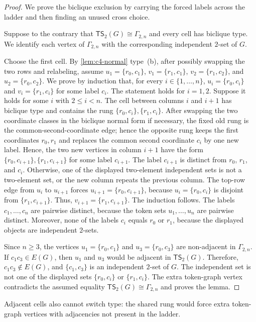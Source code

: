 \documentclass[a4paper]{article}
\theoremstyle{plain}
\theoremstyle{definition}
\newcommand{\TSsym}{\mathsf{TS}}
\numberwithin{equation}{section}
\begin{document}
\begin{proof}
We prove the biclique exclusion by carrying the forced labels across the ladder and then finding an unused cross choice.

Suppose to the contrary that $\TSsym_2(G)\cong \Gamma_{2,n}$ and every cell has biclique type.
We identify each vertex of $\Gamma_{2,n}$ with the corresponding independent $2$-set of $G$.

Choose the first cell.
By \cref{lem:c4-normal} type~\textup{(b)}, after possibly swapping the two rows and relabeling, assume $u_1=\{r_0,c_1\}$, $v_1=\{r_1,c_1\}$, $v_2=\{r_1,c_2\}$, and $u_2=\{r_0,c_2\}$.
We prove by induction that, for every $i\in\{1,\ldots,n\}$,
$u_i=\{r_0,c_i\}$ and $v_i=\{r_1,c_i\}$
for some label $c_i$.
The statement holds for $i=1,2$.
Suppose it holds for some $i$ with $2\le i<n$.
The cell between columns $i$ and $i+1$ has biclique type and contains the rung $\{r_0,c_i\},\{r_1,c_i\}$.
After swapping the two coordinate classes in the biclique normal form if necessary, the fixed old rung is the common-second-coordinate edge; hence the opposite rung keeps the first coordinates $r_0,r_1$ and replaces the common second coordinate $c_i$ by one new label.
Hence, the two new vertices in column $i+1$ have the form $\{r_0,c_{i+1}\},\{r_1,c_{i+1}\}$
for some label $c_{i+1}$.
The label $c_{i+1}$ is distinct from $r_0$, $r_1$, and $c_i$.
Otherwise, one of the displayed two-element independent sets is not a two-element set, or the new column repeats the previous column.
The top-row edge from $u_i$ to $u_{i+1}$ forces $u_{i+1}=\{r_0,c_{i+1}\}$, because $u_i=\{r_0,c_i\}$ is disjoint from $\{r_1,c_{i+1}\}$.
Thus, $v_{i+1}=\{r_1,c_{i+1}\}$.
The induction follows.
The labels $c_1,\ldots,c_n$ are pairwise distinct, because the token sets $u_1,\ldots,u_n$ are pairwise distinct.
Moreover, none of the labels $c_i$ equals $r_0$ or $r_1$, because the displayed objects are independent $2$-sets.

Since $n\ge 3$, the vertices $u_1=\{r_0,c_1\}$ and $u_3=\{r_0,c_3\}$ are non-adjacent in $\Gamma_{2,n}$.
If $c_1c_3\in E(G)$, then $u_1$ and $u_3$ would be adjacent in $\TSsym_2(G)$.
Therefore, $c_1c_3\notin E(G)$, and $\{c_1,c_3\}$ is an independent $2$-set of $G$.
The independent set is not one of the displayed sets $\{r_0,c_i\}$ or $\{r_1,c_i\}$.
The extra token-graph vertex contradicts the assumed equality $\TSsym_2(G)\cong\Gamma_{2,n}$ and proves the lemma.
\end{proof}

Adjacent cells also cannot switch type: the shared rung would force extra token-graph vertices with adjacencies not present in the ladder.
\end{document}
